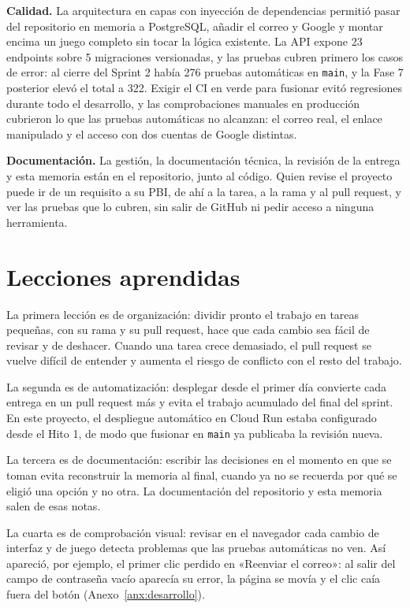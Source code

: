 \textbf{Calidad.} La arquitectura en capas con inyección de dependencias permitió pasar del repositorio en memoria a PostgreSQL, añadir el correo y Google y montar encima un juego completo sin tocar la lógica existente. La API expone 23 endpoints sobre 5 migraciones versionadas, y las pruebas cubren primero los casos de error: al cierre del Sprint 2 había 276 pruebas automáticas en \texttt{main}, y la Fase 7 posterior elevó el total a 322. Exigir el CI en verde para fusionar evitó regresiones durante todo el desarrollo, y las comprobaciones manuales en producción cubrieron lo que las pruebas automáticas no alcanzan: el correo real, el enlace manipulado y el acceso con dos cuentas de Google distintas.

\textbf{Documentación.} La gestión, la documentación técnica, la revisión de la entrega y esta memoria están en el repositorio, junto al código. Quien revise el proyecto puede ir de un requisito a su PBI, de ahí a la tarea, a la rama y al pull request, y ver las pruebas que lo cubren, sin salir de GitHub ni pedir acceso a ninguna herramienta.

\section{Lecciones aprendidas}

La primera lección es de organización: dividir pronto el trabajo en tareas pequeñas, con su rama y su pull request, hace que cada cambio sea fácil de revisar y de deshacer. Cuando una tarea crece demasiado, el pull request se vuelve difícil de entender y aumenta el riesgo de conflicto con el resto del trabajo.

La segunda es de automatización: desplegar desde el primer día convierte cada entrega en un pull request más y evita el trabajo acumulado del final del sprint. En este proyecto, el despliegue automático en Cloud Run estaba configurado desde el Hito 1, de modo que fusionar en \texttt{main} ya publicaba la revisión nueva.

La tercera es de documentación: escribir las decisiones en el momento en que se toman evita reconstruir la memoria al final, cuando ya no se recuerda por qué se eligió una opción y no otra. La documentación del repositorio y esta memoria salen de esas notas.

La cuarta es de comprobación visual: revisar en el navegador cada cambio de interfaz y de juego detecta problemas que las pruebas automáticas no ven. Así apareció, por ejemplo, el primer clic perdido en «Reenviar el correo»: al salir del campo de contraseña vacío aparecía su error, la página se movía y el clic caía fuera del botón (Anexo~\ref{anx:desarrollo}).

